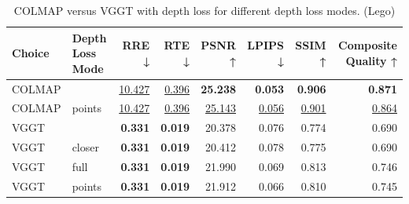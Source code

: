 \begin{table}[H]
\caption{COLMAP versus VGGT with depth loss for different depth loss modes. (Lego)}
\label{tab:05_depth_loss_mode_lego}
\small
\begin{tabular}{llrrrrrr}
\toprule
Choice & Depth Loss Mode & RRE ↓ & RTE ↓ & PSNR ↑ & LPIPS ↓ & SSIM ↑ & Composite Quality ↑ \\
\midrule
COLMAP &  & \underline{10.427} & \underline{0.396} & \textbf{25.238} & \textbf{0.053} & \textbf{0.906} & \textbf{0.871} \\
COLMAP & points & \underline{10.427} & \underline{0.396} & \underline{25.143} & \underline{0.056} & \underline{0.901} & \underline{0.864} \\
VGGT &  & \textbf{0.331} & \textbf{0.019} & 20.378 & 0.076 & 0.774 & 0.690 \\
VGGT & closer & \textbf{0.331} & \textbf{0.019} & 20.412 & 0.078 & 0.775 & 0.690 \\
VGGT & full & \textbf{0.331} & \textbf{0.019} & 21.990 & 0.069 & 0.813 & 0.746 \\
VGGT & points & \textbf{0.331} & \textbf{0.019} & 21.912 & 0.066 & 0.810 & 0.745 \\
\bottomrule
\end{tabular}
\end{table}